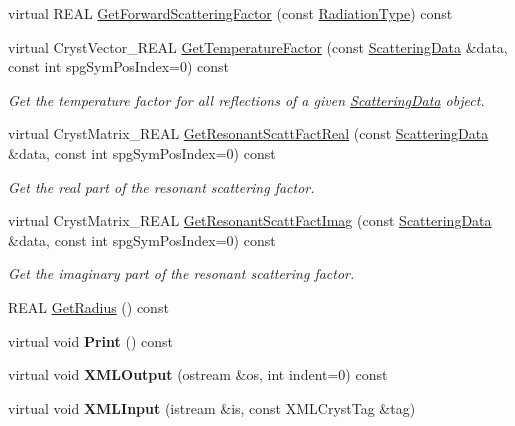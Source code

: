 \begin{DoxyCompactItemize}
virtual R\+E\+AL \mbox{\hyperlink{class_obj_cryst_1_1_scattering_power_sphere_acb5f0ee9cefb940656dea42f7542c0ad}{Get\+Forward\+Scattering\+Factor}} (const \mbox{\hyperlink{namespace_obj_cryst_a48fe50a094c607f8897378934d3d73ef}{Radiation\+Type}}) const
\item 
virtual Cryst\+Vector\+\_\+\+R\+E\+AL \mbox{\hyperlink{class_obj_cryst_1_1_scattering_power_sphere_a279d60a417e6378ad001be222385cced}{Get\+Temperature\+Factor}} (const \mbox{\hyperlink{class_obj_cryst_1_1_scattering_data}{Scattering\+Data}} \&data, const int spg\+Sym\+Pos\+Index=0) const
\begin{DoxyCompactList}\small\item\em Get the temperature factor for all reflections of a given \mbox{\hyperlink{class_obj_cryst_1_1_scattering_data}{Scattering\+Data}} object. \end{DoxyCompactList}\item 
virtual Cryst\+Matrix\+\_\+\+R\+E\+AL \mbox{\hyperlink{class_obj_cryst_1_1_scattering_power_sphere_ae4bfc8319aa74f69eca021050f8d445d}{Get\+Resonant\+Scatt\+Fact\+Real}} (const \mbox{\hyperlink{class_obj_cryst_1_1_scattering_data}{Scattering\+Data}} \&data, const int spg\+Sym\+Pos\+Index=0) const
\begin{DoxyCompactList}\small\item\em Get the real part of the resonant scattering factor. \end{DoxyCompactList}\item 
virtual Cryst\+Matrix\+\_\+\+R\+E\+AL \mbox{\hyperlink{class_obj_cryst_1_1_scattering_power_sphere_a66b0eb24b24b92e6bbdf677c53853aad}{Get\+Resonant\+Scatt\+Fact\+Imag}} (const \mbox{\hyperlink{class_obj_cryst_1_1_scattering_data}{Scattering\+Data}} \&data, const int spg\+Sym\+Pos\+Index=0) const
\begin{DoxyCompactList}\small\item\em Get the imaginary part of the resonant scattering factor. \end{DoxyCompactList}\item 
R\+E\+AL \mbox{\hyperlink{class_obj_cryst_1_1_scattering_power_sphere_a0e4cb0c9f333c38f9b6436c54d52a580}{Get\+Radius}} () const
\item 
\mbox{\label{class_obj_cryst_1_1_scattering_power_sphere_aad36caaa23a77f242493590eb5082965}} 
virtual void {\bfseries Print} () const
\item 
\mbox{\label{class_obj_cryst_1_1_scattering_power_sphere_a0c0a7bb4085bb22e02e5ff53140db3dc}} 
virtual void {\bfseries X\+M\+L\+Output} (ostream \&os, int indent=0) const
\item 
\mbox{\label{class_obj_cryst_1_1_scattering_power_sphere_a7b7d3f960820b88f2b2addecffa426d8}} 
virtual void {\bfseries X\+M\+L\+Input} (istream \&is, const X\+M\+L\+Cryst\+Tag \&tag)
\end{DoxyCompactItemize}
